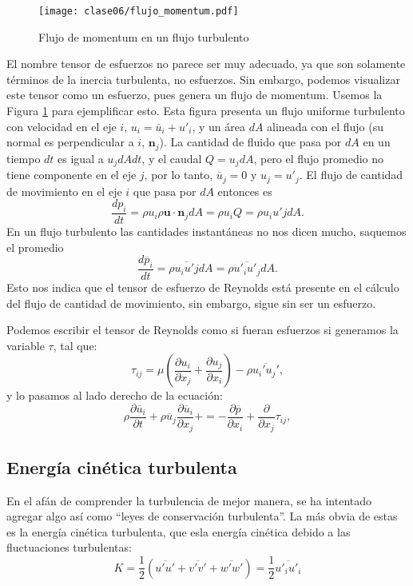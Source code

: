 \begin{figure}[h!]
\centering
\texttt{[image: clase06/flujo\_momentum.pdf]}
\caption{Flujo de momentum en un flujo turbulento}
\label{fig:flujo_momentum}
\end{figure}
%
El nombre tensor de esfuerzos no parece ser muy adecuado, ya que son solamente términos de la inercia turbulenta, no esfuerzos.
Sin embargo, podemos visualizar este tensor como un esfuerzo, pues genera un flujo de momentum.
Usemos la Figura \ref{fig:flujo_momentum} para ejemplificar esto.
Esta figura presenta un flujo uniforme turbulento con velocidad en el eje $i$, $u_i = \overline{u}_i + u'_i$, y un área $dA$ alineada con el flujo (su normal es perpendicular a $i$, $\mathbf{n}_j$).
La cantidad de fluido que pasa por $dA$ en un tiempo $dt$ es igual a $u_jdAdt$, y el caudal $Q=u_jdA$, pero el flujo promedio no tiene componente en el eje $j$, por lo tanto, $\overline{u}_j=0$ y $u_j = u'_j$.
El flujo de cantidad de movimiento en el eje $i$ que pasa por $dA$ entonces es 
%
\begin{equation}
\frac{dp_i}{dt} = \rho u_i \rho \mathbf{u}\cdot\mathbf{n}_j dA = \rho u_i Q = \rho u_i u'j dA.
\end{equation}
%
En un flujo turbulento las cantidades instantáneas no nos dicen mucho, saquemos el promedio
%
\begin{equation}
\frac{d\overline{p}_i}{dt} = \rho \overline{u_i u'j} dA = \rho \overline{u'_iu'_j}dA.
\end{equation}
%
Esto nos indica que el tensor de esfuerzo de Reynolds está presente en el cálculo del flujo de cantidad de movimiento, sin embargo, sigue sin ser un esfuerzo.

Podemos escribir el tensor de Reynolds como si fueran esfuerzos si generamos la variable $\tau$, tal que:
%
\begin{equation}
\tau_{ij} = \mu\left(\frac{\partial u_i}{\partial x_j} + \frac{\partial u_j}{\partial x_i}\right) - \rho \overline{u_i'u_j'},
\end{equation}
%
y lo pasamos al lado derecho de la ecuación:
%
\begin{equation}\label{eq:tensor}
\rho\frac{\partial \overline{u}_i}{\partial t} + \rho\overline{u}_j\frac{\partial \overline{u}_i}{\partial x_j} +  = -\frac{\partial \overline{p}}{\partial x_i} + \frac{\partial}{\partial x_j}\tau_{ij},
\end{equation}



\subsection*{Energía cinética turbulenta}
En el afán de comprender la turbulencia de mejor manera, se ha intentado agregar algo así como ``leyes de conservación turbulenta''.
La más obvia de estas es la energía cinética turbulenta, que esla energía cinética debido a las fluctuaciones turbulentas:
%
\begin{equation}
K = \frac{1}{2}\left( \overline{u'u'}+\overline{v'v'}+\overline{w'w'}\right)=\frac{1}{2}\overline{u'_iu'_i}
\end{equation}

